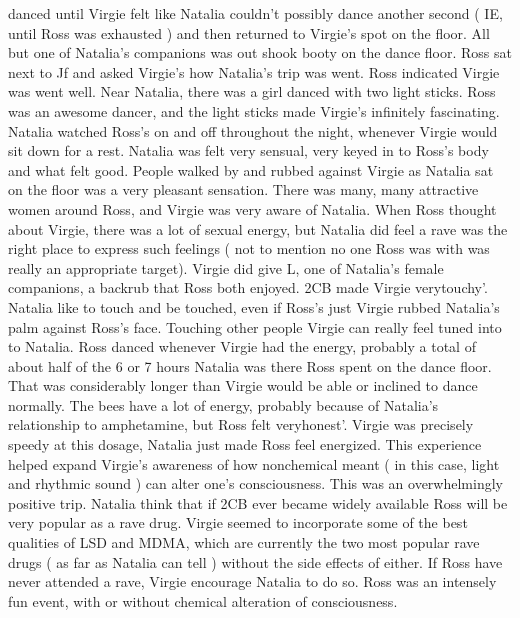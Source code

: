 \documentclass[12pt]{book}
\begin{document}
danced until Virgie felt like Natalia couldn't possibly dance another second ( IE, until Ross was exhausted ) and then returned to Virgie's spot on the floor. All but one of Natalia's companions was out shook booty on the dance floor. Ross sat next to Jf and asked Virgie's how Natalia's trip was went. Ross indicated Virgie was went well. Near Natalia, there was a girl danced with two light sticks. Ross was an awesome dancer, and the light sticks made Virgie's infinitely fascinating. Natalia watched Ross's on and off throughout the night, whenever Virgie would sit down for a rest. Natalia was felt very sensual, very keyed in to Ross's body and what felt good. People walked by and rubbed against Virgie as Natalia sat on the floor was a very pleasant sensation. There was many, many attractive women around Ross, and Virgie was very aware of Natalia. When Ross thought about Virgie, there was a lot of sexual energy, but Natalia did feel a rave was the right place to express such feelings ( not to mention no one Ross was with was really an appropriate target). Virgie did give L, one of Natalia's female companions, a backrub that Ross both enjoyed. 2CB made Virgie verytouchy'. Natalia like to touch and be touched, even if Ross's just Virgie rubbed Natalia's palm against Ross's face. Touching other people Virgie can really feel tuned into to Natalia. Ross danced whenever Virgie had the energy, probably a total of about half of the 6 or 7 hours Natalia was there Ross spent on the dance floor. That was considerably longer than Virgie would be able or inclined to dance normally. The bees have a lot of energy, probably because of Natalia's relationship to amphetamine, but Ross felt veryhonest'. Virgie was precisely speedy at this dosage, Natalia just made Ross feel energized. This experience helped expand Virgie's awareness of how nonchemical meant ( in this case, light and rhythmic sound ) can alter one's consciousness. This was an overwhelmingly positive trip. Natalia think that if 2CB ever became widely available Ross will be very popular as a rave drug. Virgie seemed to incorporate some of the best qualities of LSD and MDMA, which are currently the two most popular rave drugs ( as far as Natalia can tell ) without the side effects of either. If Ross have never attended a rave, Virgie encourage Natalia to do so. Ross was an intensely fun event, with or without chemical alteration of consciousness.
\end{document}
